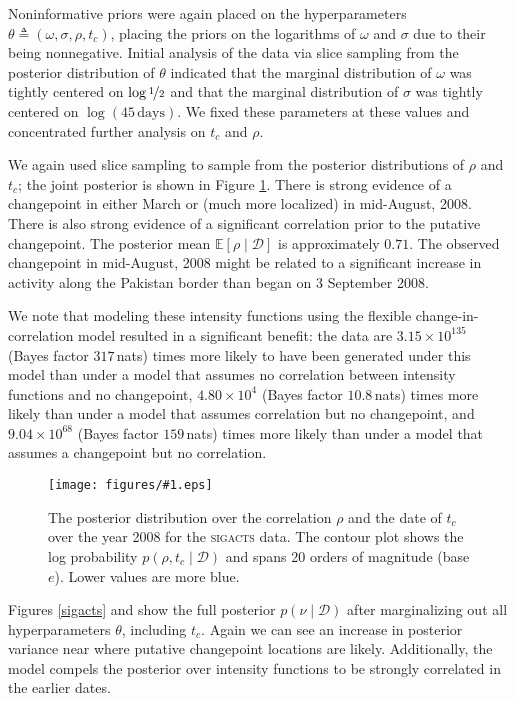\documentclass{article}
\newcommand{\deq}{\triangleq}
\newcommand{\psff}[1]{\texttt{[image: figures/\#1.eps]}}
\newcommand{\cm}[1]{\mathcal{#1}}
\newcommand{\data}{\cm{D}}
\newcommand{\given}{\mid}
\begin{document}
Noninformative priors were again placed on the hyperparameters $\theta
\deq (\omega, \sigma, \rho, t_c)$, placing the priors on the
logarithms of $\omega$ and $\sigma$ due to their being
nonnegative. Initial analysis of the data via slice sampling from the
posterior distribution of $\theta$ indicated that the marginal
distribution of $\omega$ was tightly centered on $\log
\nicefrac{1}{2}$ and that the marginal distribution of $\sigma$ was
tightly centered on $\log(45\, \text{days})$.  We fixed these parameters
at these values and concentrated further analysis on $t_c$ and $\rho$.

We again used slice sampling to sample from the posterior
distributions of $\rho$ and $t_c$; the joint posterior is shown in
Figure \ref{sigactsjoint}.  There is strong evidence of a changepoint
in either March or (much more localized) in mid-August, 2008.  There
is also strong evidence of a significant correlation prior to the
putative changepoint.  The posterior mean $\mathbb{E}[\rho \given
  \data]$ is approximately $0.71$.  The observed changepoint in
mid-August, 2008 might be related to a significant increase in
activity along the Pakistan border than began on 3 September 2008.

We note that modeling these intensity functions using the flexible
change-in-correlation model resulted in a significant benefit: the
data are $3.15 \times 10^{135}$ (Bayes factor $317$\,nats) times more
likely to have been generated under this model than under a model that
assumes no correlation between intensity functions and no changepoint,
$4.80 \times 10^{4}$ (Bayes factor $10.8$\,nats) times more likely
than under a model that assumes correlation but no changepoint, and
$9.04 \times 10^{68}$ (Bayes factor $159$\,nats) times more likely
than under a model that assumes a changepoint but no correlation.

\begin{figure}
  \centering \psff{sigacts_posterior}
  \caption{The posterior distribution over the correlation $\rho$ and
    the date of $t_c$ over the year 2008 for the \textsc{sigacts}
    data.  The contour plot shows the log probability $p(\rho, t_c
    \given \data)$ and spans 20 orders of magnitude (base $e$).  Lower
    values are more blue.}
  \label{sigactsjoint}
\end{figure}

Figures \ref{sigacts} and  show the
full posterior $p(\nu \given \data)$ after marginalizing out all
hyperparameters $\theta$, including $t_c$.  Again we can see an
increase in posterior variance near where putative changepoint
locations are likely.  Additionally, the model compels the posterior
over intensity functions to be strongly correlated in the earlier
dates.
\end{document}
